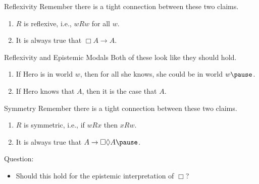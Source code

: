 \documentclass[
  ignorenonframetext,
]{beamer}
\providecommand{\tightlist}{%
  \setlength{\itemsep}{0pt}\setlength{\parskip}{0pt}}
\renewcommand{\,}{\text{, }}
\begin{document}
\begin{frame}{Reflexivity}
\protect\hypertarget{reflexivity}{}
Remember there is a tight connection between these two claims.

\begin{enumerate}
\tightlist
\item
  \(R\) is reflexive, i.e., \(wRw\) for all \(w\).
\item
  It is always true that \(\Box A \rightarrow A\).
\end{enumerate}
\end{frame}

\begin{frame}{Reflexivity and Epistemic Modals}
\protect\hypertarget{reflexivity-and-epistemic-modals}{}
Both of these look like they should hold.

\begin{enumerate}
\tightlist
\item
  If Hero is in world \(w\), then for all she knows, she could be in
  world \(w \pause\).
\item
  If Hero knows that \(A\), then it is the case that \(A\).
\end{enumerate}
\end{frame}

\begin{frame}{Symmetry}
\protect\hypertarget{symmetry}{}
Remember there is a tight connection between these two claims.

\begin{enumerate}
\tightlist
\item
  \(R\) is symmetric, i.e., if \(wRx\) then \(xRw\).
\item
  It is always true that \(A \rightarrow \Box \Diamond A \pause\).
\end{enumerate}

Question:

\begin{itemize}
\tightlist
\item
  Should this hold for the epistemic interpretation of \(\Box\)?
\end{itemize}
\end{frame}
\end{document}
